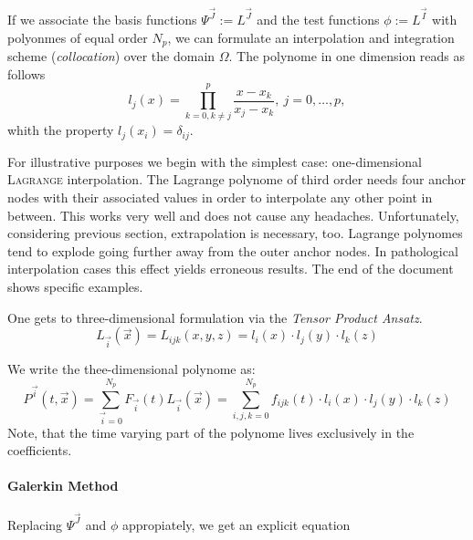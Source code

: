 If we associate the basis functions $\Psi^{\vec{J}} := L^{\vec{J}}$ and the test functions $\phi := L^{\vec{I}}$ with
 polyonmes of equal order $N_p$, we can formulate an interpolation and
integration scheme (\emph{collocation}) over the domain $\Omega$. The polynome in one dimension reads as follows
\begin{equation}
l_j(x) = \prod^p_{k=0,k\neq j} \frac{x-x_k}{x_j-x_k}, \ j = 0,\dots,p,
\end{equation}
whith the  property $l_j(x_i) = \delta_{ij}$.

For illustrative purposes we begin with the simplest case: one-dimensional
\textsc{Lagrange} interpolation.
The Lagrange polynome of third order needs four anchor nodes with their
associated values in order to interpolate any other point in between. This
works very well and does not cause any headaches. Unfortunately, considering
previous section, extrapolation is necessary, too. Lagrange polynomes tend to
explode going further away from the outer anchor nodes. In pathological
interpolation cases this effect yields erroneous results. The end of the
document shows specific examples.

One gets to three-dimensional formulation via the \emph{Tensor Product Ansatz}.
\newcommand{\LI}{L_{\vec{i}}(\vec{x})}
\begin{equation}
\label{eq-tensor-ansatz}
    \LI = L_{ijk}(x,y,z) = l_i(x) \cdot l_j(y) \cdot l_k(z)
\end{equation}

We write the thee-dimensional polynome as:
\newcommand{\PI}{P^{\vec{i}}(t,\vec{x})}
\newcommand{\FI}{F_{\vec{i}}(t)}
\newcommand{\sumI}{\sum^{N_p}_{\vec{i}=0}}
\begin{equation}
\label{eq-tensor-ansatz}
    \PI = \sumI \FI \LI = \sum^{N_p}_{i,j,k = 0} f_{ijk}(t) \cdot l_i(x) \cdot l_j(y) \cdot l_k(z)
\end{equation}
Note, that the time varying part of the polynome lives exclusively in the coefficients.

\paragraph{Galerkin Method}

Replacing $\Psi^{\vec{J}}$ and $\phi$ appropiately, we get an explicit equation

\newcommand{\FJ}{F_{\vec{j}}(t)}
\newcommand{\GJ}{G_{\vec{j}}(t)}
\newcommand{\HJ}{H_{\vec{j}}(t)}

